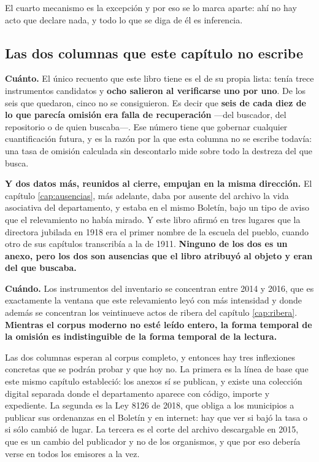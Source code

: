 El cuarto mecanismo es la excepción y por eso se lo marca aparte: ahí no hay acto que declare
nada, y todo lo que se diga de él es inferencia.

\subsection*{Las dos columnas que este capítulo no escribe}

\textbf{Cuánto.} El único recuento que este libro tiene es el de su propia lista: tenía trece
instrumentos candidatos y \textbf{ocho salieron al verificarse uno por uno}. De los seis que
quedaron, cinco no se consiguieron. Es decir que \textbf{seis de cada diez de lo que parecía
omisión era falla de recuperación} ---del buscador, del repositorio o de quien buscaba---. Ese
número tiene que gobernar cualquier cuantificación futura, y es la razón por la que esta
columna no se escribe todavía: una tasa de omisión calculada sin descontarlo mide sobre todo la
destreza del que busca.

\textbf{Y dos datos más, reunidos al cierre, empujan en la misma dirección.} El capítulo
\ref{cap:ausencias}, más adelante, daba por ausente del archivo la vida asociativa del departamento, y estaba en
el mismo Boletín, bajo un tipo de aviso que el relevamiento no había mirado. Y este libro afirmó
en tres lugares que la directora jubilada en 1918 era el primer nombre de la escuela del pueblo,
cuando otro de sus capítulos transcribía a la de 1911. \textbf{Ninguno de los dos es un anexo,
pero los dos son ausencias que el libro atribuyó al objeto y eran del que buscaba.}

\textbf{Cuándo.} Los instrumentos del inventario se concentran entre 2014 y 2016, que es
exactamente la ventana que este relevamiento leyó con más intensidad y donde además se
concentran los veintinueve actos de ribera del capítulo \ref{cap:ribera}. \textbf{Mientras el
corpus moderno no esté leído entero, la forma temporal de la omisión es indistinguible de la
forma temporal de la lectura.}

\begin{cautela}
Las dos columnas esperan al corpus completo, y entonces hay tres inflexiones concretas que se
podrán probar y que hoy no. La primera es la línea de base que este mismo capítulo estableció:
los anexos sí se publican, y existe una colección digital separada donde el departamento
aparece con código, importe y expediente. La segunda es la Ley 8126 de 2018, que obliga a los
municipios a publicar sus ordenanzas en el Boletín y en internet: hay que ver si bajó la tasa o
si sólo cambió de lugar. La tercera es el corte del archivo descargable en 2015, que es un
cambio del publicador y no de los organismos, y que por eso debería verse en todos los emisores
a la vez.
\end{cautela}

